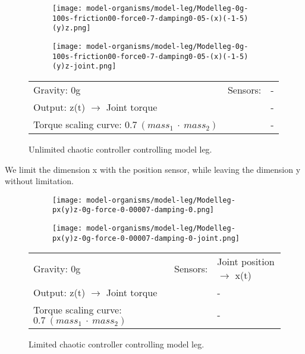 \documentclass[main]{subfiles}
\begin{document}

\begin{figure}[H]
	\centering
	\begin{subfigure}[c]{0.45\textwidth}
	\texttt{[image: model-organisms/model-leg/Modelleg-0g-100s-friction00-force0-7-damping0-05-(x)(-1-5)(y)z.png]}
	\end{subfigure}
	\begin{subfigure}[c]{0.45\textwidth}
	\texttt{[image: model-organisms/model-leg/Modelleg-0g-100s-friction00-force0-7-damping0-05-(x)(-1-5)(y)z-joint.png]}
	\end{subfigure}
	\caption[Unlimited chaotic controller controlling model leg]{Unlimited chaotic controller controlling model leg.}
	\begin{tabular}{l|ll}
	\hline 
	Gravity: 0g  & Sensors: & - \\
	 Output: z(t) \(\rightarrow\) Joint torque & & - \\
	  Torque scaling curve: \(0.7~(mass_1~\cdot~mass_2)\) & & - \\
	  \hline
	\end{tabular}

	\label{figure:unlimited-model-leg}
\end{figure}

We limit the dimension x with the position sensor, while leaving the dimension y without limitation.

\begin{figure}[H]
	\centering
		\begin{subfigure}[c]{0.45\textwidth}
	\texttt{[image: model-organisms/model-leg/Modelleg-px(y)z-0g-force-0-00007-damping-0.png]}
		\end{subfigure}
	\begin{subfigure}[c]{0.45\textwidth}
	\texttt{[image: model-organisms/model-leg/Modelleg-px(y)z-0g-force-0-00007-damping-0-joint.png]}
		\end{subfigure}
	\caption[Limited chaotic controller controlling model leg]{Limited chaotic controller controlling model leg.}
	\begin{tabular}{l|ll}
	\hline 
	Gravity: 0g  & Sensors: & Joint position \(\rightarrow\) x(t)\\
	 Output: z(t) \(\rightarrow\) Joint torque & & - \\
	  Torque scaling curve: \(0.7~(mass_1~\cdot~mass_2)\) & & - \\
	  \hline
	\end{tabular}
	\label{figure:limited-model-leg1}
\end{figure}
\end{document}
